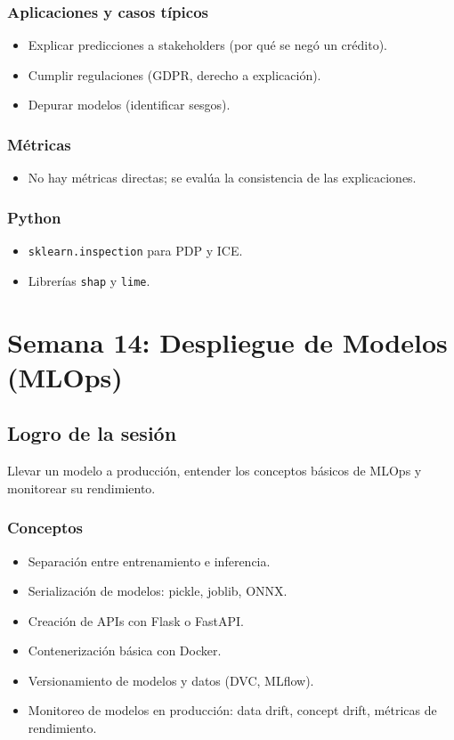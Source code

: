 \documentclass[12pt,a4paper,openany,oneside]{book}
\begin{document}
\subsection{Aplicaciones y casos típicos}
\begin{itemize}
    \item Explicar predicciones a stakeholders (por qué se negó un crédito).
    \item Cumplir regulaciones (GDPR, derecho a explicación).
    \item Depurar modelos (identificar sesgos).
\end{itemize}

\subsection{Métricas}
\begin{itemize}
    \item No hay métricas directas; se evalúa la consistencia de las explicaciones.
\end{itemize}

\subsection{Python}
\begin{itemize}
    \item \texttt{sklearn.inspection} para PDP y ICE.
    \item Librerías \texttt{shap} y \texttt{lime}.
\end{itemize}

\chapter{Semana 14: Despliegue de Modelos (MLOps)}

\section{Logro de la sesión}
Llevar un modelo a producción, entender los conceptos básicos de MLOps y monitorear su rendimiento.

\subsection{Conceptos}
\begin{itemize}
    \item Separación entre entrenamiento e inferencia.
    \item Serialización de modelos: pickle, joblib, ONNX.
    \item Creación de APIs con Flask o FastAPI.
    \item Contenerización básica con Docker.
    \item Versionamiento de modelos y datos (DVC, MLflow).
    \item Monitoreo de modelos en producción: data drift, concept drift, métricas de rendimiento.
\end{itemize}
\end{document}
